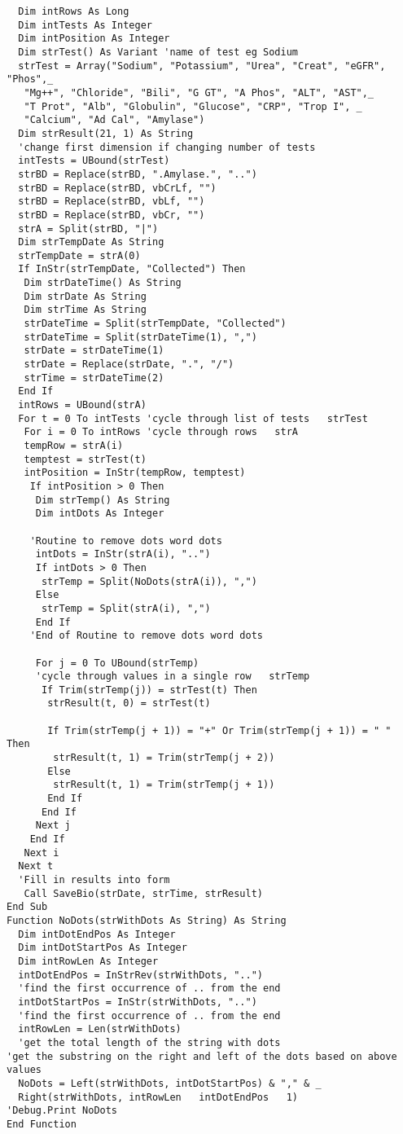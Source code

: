 \begin{lstlisting}
  Dim intRows As Long
  Dim intTests As Integer
  Dim intPosition As Integer
  Dim strTest() As Variant 'name of test eg Sodium
  strTest = Array("Sodium", "Potassium", "Urea", "Creat", "eGFR", "Phos",_
   "Mg++", "Chloride", "Bili", "G GT", "A Phos", "ALT", "AST",_
   "T Prot", "Alb", "Globulin", "Glucose", "CRP", "Trop I", _
   "Calcium", "Ad Cal", "Amylase")
  Dim strResult(21, 1) As String 
  'change first dimension if changing number of tests
  intTests = UBound(strTest)
  strBD = Replace(strBD, ".Amylase.", "..")
  strBD = Replace(strBD, vbCrLf, "")
  strBD = Replace(strBD, vbLf, "")
  strBD = Replace(strBD, vbCr, "")
  strA = Split(strBD, "|")
  Dim strTempDate As String
  strTempDate = strA(0)
  If InStr(strTempDate, "Collected") Then
   Dim strDateTime() As String
   Dim strDate As String
   Dim strTime As String
   strDateTime = Split(strTempDate, "Collected")
   strDateTime = Split(strDateTime(1), ",")
   strDate = strDateTime(1)
   strDate = Replace(strDate, ".", "/")
   strTime = strDateTime(2)
  End If
  intRows = UBound(strA)
  For t = 0 To intTests 'cycle through list of tests   strTest
   For i = 0 To intRows 'cycle through rows   strA
   tempRow = strA(i)
   temptest = strTest(t)
   intPosition = InStr(tempRow, temptest)
    If intPosition > 0 Then
     Dim strTemp() As String
     Dim intDots As Integer
     
    'Routine to remove dots word dots
     intDots = InStr(strA(i), "..")
     If intDots > 0 Then
      strTemp = Split(NoDots(strA(i)), ",")
     Else
      strTemp = Split(strA(i), ",")
     End If
    'End of Routine to remove dots word dots
     
     For j = 0 To UBound(strTemp) 
     'cycle through values in a single row   strTemp
      If Trim(strTemp(j)) = strTest(t) Then
       strResult(t, 0) = strTest(t)
       
       If Trim(strTemp(j + 1)) = "+" Or Trim(strTemp(j + 1)) = " " Then
        strResult(t, 1) = Trim(strTemp(j + 2))
       Else
        strResult(t, 1) = Trim(strTemp(j + 1))
       End If
      End If
     Next j
    End If
   Next i
  Next t
  'Fill in results into form
   Call SaveBio(strDate, strTime, strResult)
End Sub
Function NoDots(strWithDots As String) As String
  Dim intDotEndPos As Integer
  Dim intDotStartPos As Integer
  Dim intRowLen As Integer
  intDotEndPos = InStrRev(strWithDots, "..") 
  'find the first occurrence of .. from the end
  intDotStartPos = InStr(strWithDots, "..") 
  'find the first occurrence of .. from the end
  intRowLen = Len(strWithDots) 
  'get the total length of the string with dots
'get the substring on the right and left of the dots based on above values
  NoDots = Left(strWithDots, intDotStartPos) & "," & _
  Right(strWithDots, intRowLen   intDotEndPos   1)
'Debug.Print NoDots
End Function


\end{lstlisting}
